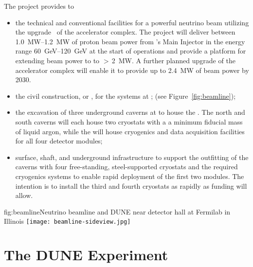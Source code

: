 The  project provides to 
\begin{itemize}
\item  the  technical and conventional facilities for a powerful neutrino beam utilizing the  upgrade~\cite{pip2-2013} of the  accelerator 
complex. The  project will deliver between \SIrange{1.0}{1.2}{MW} of proton beam power from 's Main Injector in the energy range  \SIrange{60}{120}{GeV} at the start of  operations and provide a platform for extending beam power to  to %
$>\,$\SI{2}{MW}. %
A further planned upgrade 
of the accelerator complex will enable it to provide up to \SI{2.4}{\MW} of beam power by 2030. 

\item  the civil construction, or , for the  systems at ; (see Figure~\ref{fig:beamline});

\item the excavation of three underground caverns at  to house the . The north and south caverns will each house two cryostats with a
a minimum \nominalmodsize fiducial mass of liquid argon, while the  will house cryogenics and data acquisition facilities for all four detector modules;

\item surface, shaft, and underground infrastructure to support 
the outfitting of the caverns with four free-standing, steel-supported cryostats 
and the required cryogenics systems to enable rapid deployment of the first two \nominalmodsize {} modules. 
The intention is to install the third and fourth cryostats as rapidly as funding will 
allow.

\end{itemize}


\begin{dunefigure}{fig:beamline}{Neutrino beamline and DUNE near detector hall at Fermilab in Illinois}
\texttt{[image: beamline-sideview.jpg]}
\end{dunefigure}



\section{The DUNE Experiment}

